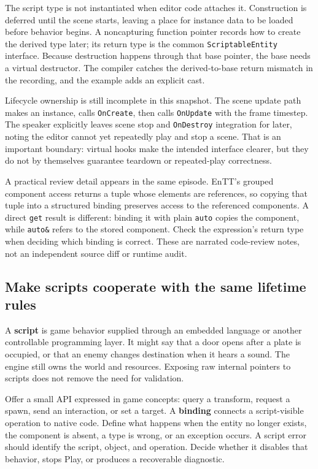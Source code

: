 The script type is not instantiated when editor code attaches it. Construction is deferred until the scene starts, leaving a place for instance data to be loaded before behavior begins. A noncapturing function pointer records how to create the derived type later; its return type is the common \texttt{ScriptableEntity} interface. Because destruction happens through that base pointer, the base needs a virtual destructor. The compiler catches the derived-to-base return mismatch in the recording, and the example adds an explicit cast.

Lifecycle ownership is still incomplete in this snapshot. The scene update path makes an instance, calls \texttt{OnCreate}, then calls \texttt{OnUpdate} with the frame timestep. The speaker explicitly leaves scene stop and \texttt{OnDestroy} integration for later, noting the editor cannot yet repeatedly play and stop a scene. That is an important boundary: virtual hooks make the intended interface clearer, but they do not by themselves guarantee teardown or repeated-play correctness.

A practical review detail appears in the same episode. EnTT's grouped component access returns a tuple whose elements are references, so copying that tuple into a structured binding preserves access to the referenced components. A direct \texttt{get} result is different: binding it with plain \texttt{auto} copies the component, while \texttt{auto\&} refers to the stored component. Check the expression's return type when deciding which binding is correct. These are narrated code-review notes, not an independent source diff or runtime audit.

\subsection{Make scripts cooperate with the same lifetime rules}\label{06-engine-ii-ch040-make-scripts-cooperate-with-the-same-lifetime-rules}

A \textbf{script} is game behavior supplied through an embedded language or another controllable programming layer. It might say that a door opens after a plate is occupied, or that an enemy changes destination when it hears a sound. The engine still owns the world and resources. Exposing raw internal pointers to scripts does not remove the need for validation.

Offer a small API expressed in game concepts: query a transform, request a spawn, send an interaction, or set a target. A \textbf{binding} connects a script-visible operation to native code. Define what happens when the entity no longer exists, the component is absent, a type is wrong, or an exception occurs. A script error should identify the script, object, and operation. Decide whether it disables that behavior, stops Play, or produces a recoverable diagnostic.


